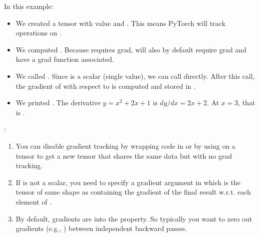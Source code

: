 \documentclass[letterpaper,10pt,english]{jupyterBook}
\begin{document}
\sphinxAtStartPar
In this example:
\begin{itemize}
\item {} 
\sphinxAtStartPar
We created a tensor  with value  and . This means PyTorch will track operations on .

\item {} 
\sphinxAtStartPar
We computed . Because  requires grad,  will also by default require grad and have a grad function associated.

\item {} 
\sphinxAtStartPar
We called . Since  is a scalar (single value), we can call  directly. After this call, the gradient of  with respect to  is computed and stored in .

\item {} 
\sphinxAtStartPar
We printed . The derivative \( y = x^2 + 2x + 1 \) is \( dy/dx = 2x + 2 \). At \( x = 3 \), that is .

\end{itemize}

\sphinxAtStartPar
{}:
\begin{enumerate}
%
\item {} 
\sphinxAtStartPar
You can disable gradient tracking by wrapping code in  or by using  on a tensor to get a new tensor that shares the same data but with no grad tracking.

\item {} 
\sphinxAtStartPar
If  is not a scalar, you need to specify a gradient argument in  which is the tensor of same shape as  containing the gradient of the final result w.r.t. each element of .

\item {} 
\sphinxAtStartPar
By default, gradients are  into the  property. So typically you want to zero out gradients (e.g., ) between independent backward passes.

\end{enumerate}
\end{document}
